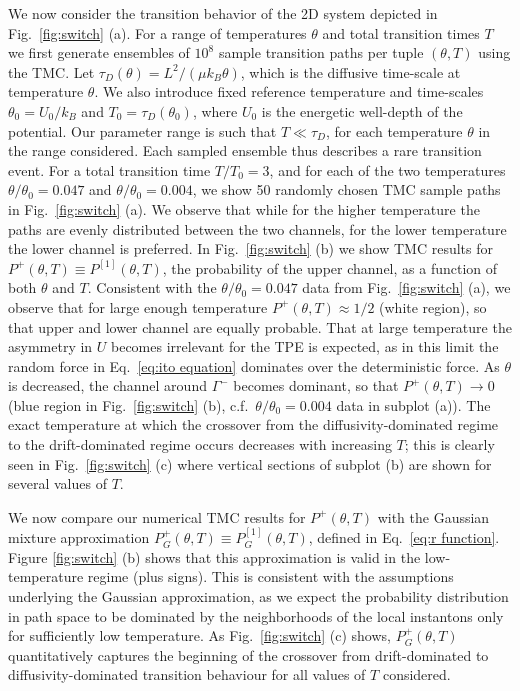 We now consider the transition behavior of the 2D
system depicted in Fig.~\ref{fig:switch} (a). For a range of temperatures
$\theta$ and total transition times $T$ we first generate ensembles
of $10^{8}$ sample transition paths per tuple $(\theta,T)$ using
the TMC. Let $\tau_{D}(\theta)=L^{2}/(\mu k_{B}\theta)$, which is
the diffusive time-scale at temperature $\theta$. We also introduce
fixed reference temperature and time-scales $\theta_{0}=U_{0}/k_{B}$
and $T_{0}=\tau_{D}(\theta_{0})$, where $U_{0}$ is the energetic
well-depth of the potential. Our parameter range is such that $T\ll\tau_{D}$,
for each temperature $\theta$ in the range considered. Each sampled
ensemble thus describes a rare transition event. For a total transition
time $T/T_{0}=3$, and for each of the two temperatures $\theta/\theta_{0}=0.047$
and $\theta/\theta_{0}=0.004$, we show 50 randomly chosen TMC sample
paths in Fig.~\ref{fig:switch} (a).  We observe that while for the
higher temperature the paths are evenly distributed between the two
channels, for the lower temperature the lower channel is preferred.
In Fig.~\ref{fig:switch} (b) we show TMC results for $P^{+}(\theta,T)\equiv P^{[1]}(\theta,T)$,
the probability of the upper channel, as a function of both $\theta$
and $T$. Consistent with the $\theta/\theta_{0}=0.047$ data from
Fig.~\ref{fig:switch} (a), we observe that for large enough temperature
$P^{+}(\theta,T)\approx1/2$ (white region), so that upper and lower
channel are equally probable. That at large temperature the asymmetry
in $U$ becomes irrelevant for the TPE is expected, as in this limit
the random force in Eq.~\eqref{eq:ito equation} dominates over the
deterministic force. As $\theta$ is decreased, the channel around
$\Gamma^{-}$ becomes dominant, so that $P^{+}(\theta,T)\rightarrow0$
(blue region in Fig.~\ref{fig:switch} (b), c.f.~$\theta/\theta_{0}=0.004$
data in subplot (a)). The exact temperature at which the crossover
from the diffusivity-dominated regime to the drift-dominated regime
occurs decreases with increasing $T$; this is clearly seen in Fig.~\ref{fig:switch}
(c) where vertical sections of subplot (b) are shown for several values
of $T$.

We now compare our numerical TMC results for $P^{+}(\theta,T)$ with
the Gaussian mixture approximation $P_{G}^{+}(\theta,T)\equiv P_{G}^{[1]}(\theta,T)$,
defined in Eq.~\eqref{eq:r function}. Figure \ref{fig:switch} (b)
shows that this approximation is valid in the low-temperature regime
(plus signs). This is consistent with the assumptions underlying the
Gaussian approximation, as we expect the probability distribution
in path space to be dominated by the neighborhoods of the local instantons
only for sufficiently low temperature. As Fig.~\ref{fig:switch}
(c) shows, $P_{G}^{+}(\theta,T)$ quantitatively captures the beginning
of the crossover from drift-dominated to diffusivity-dominated transition
behaviour for all values of $T$ considered.

